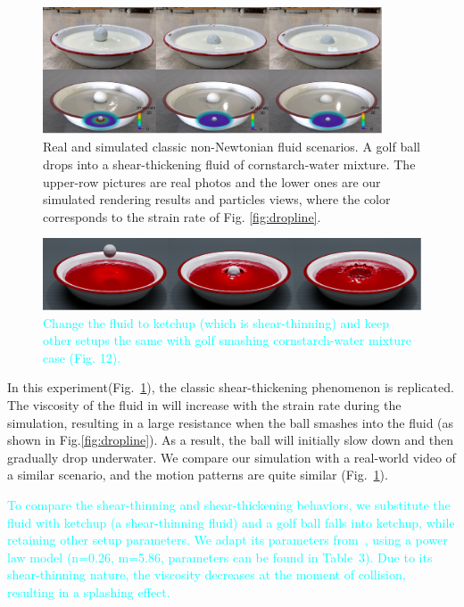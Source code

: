 \documentclass[10pt,journal,compsoc]{IEEEtran}
\newcommand{\revised}[1]{{\textcolor{cyan}{#1}}}
\begin{document}
\begin{figure}[htbp]
	\centering
	\includegraphics[width=0.9\textwidth]{pics/golf-vs-real.png}
	\caption{Real and simulated classic non-Newtonian fluid scenarios. A golf ball drops into a shear-thickening fluid of cornstarch-water mixture. The upper-row pictures are real photos and the lower ones are our simulated rendering results and particles views, where the color corresponds to the strain rate of Fig. \ref{fig:dropline}. }  \label{fig:realworld}
\end{figure}

\begin{figure}[htbp]
	\centering
	\includegraphics[width=1\textwidth]{pics/ketchup.png}
	\caption{\revised{Change the fluid to ketchup (which is shear-thinning) and keep other setups the same with golf smashing cornstarch-water mixture case (Fig. 12).}} \label{fig:ketchup}
\end{figure}

In this experiment(Fig.~\ref{fig:realworld}), the classic shear-thickening phenomenon is replicated. The viscosity of the fluid in  will increase with the strain rate during the simulation, resulting in a large resistance when the ball smashes into the fluid (as shown in Fig.\ref{fig:dropline}). As a result, the ball will initially slow down and then gradually drop underwater. We compare our simulation with a real-world video of a similar scenario, and the motion patterns are quite similar (Fig.~\ref{fig:realworld}).

\revised{ To compare the shear-thinning and shear-thickening behaviors, we substitute the fluid with ketchup (a shear-thinning fluid) and a golf ball falls into ketchup, while retaining other setup parameters. We adapt its parameters from~\cite{Bottiglieri1991}, using a power law model (n=0.26, m=5.86, parameters can be found in Table~3). Due to its shear-thinning nature, the viscosity decreases at the moment of collision, resulting in a splashing effect.}
\end{document}
